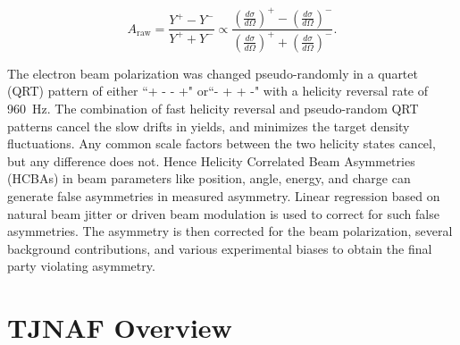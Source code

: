 \begin{equation} \label{equ:asymmetryDefinition}
A_{\textrm{raw}} = \frac{Y^{+}-Y^{-}}{Y^{+}+Y^{-}} \propto \frac{\displaystyle \left(\frac{d\sigma}{d\Omega}\right)^{+} - \left(\frac{d\sigma}{d\Omega}\right)^{-} }{\displaystyle \left(\frac{d\sigma}{d\Omega}\right)^{+} + \left(\frac{d\sigma}{d\Omega}\right)^{-}}.
\end{equation}

The electron beam polarization was changed pseudo-randomly in a quartet (QRT) pattern of either ``+ - - +" or``- + + -" with a helicity reversal rate of 960~Hz. The combination of fast helicity reversal and pseudo-random QRT patterns cancel the slow drifts in yields, and minimizes the target density fluctuations. Any common scale factors between the two helicity states cancel, but any difference does not. Hence Helicity Correlated Beam Asymmetries (HCBAs) in beam parameters like position, angle, energy, and charge can generate false asymmetries in measured asymmetry. Linear regression based on natural beam jitter or driven beam modulation is used to correct for such false asymmetries. The asymmetry is then corrected for the beam polarization, several background contributions, and various experimental biases to obtain the final party violating asymmetry.


\section{TJNAF Overview}%
\label{TJNAF}

